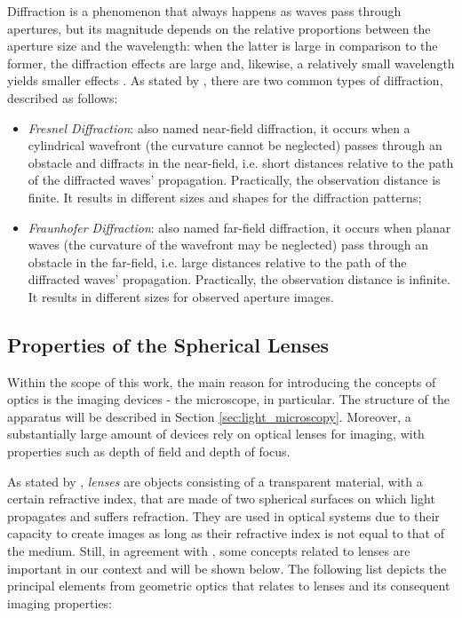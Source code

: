 Diffraction is a phenomenon that always happens as waves pass through apertures, but its magnitude depends on the relative proportions between the aperture size and the wavelength: when the latter is large in comparison to the former, the diffraction effects are large and, likewise, a relatively small wavelength yields smaller effects \cite{tipler2007physics}. As stated by , there are two common types of diffraction, described as follows:

\begin{itemize}
    \item \emph{Fresnel Diffraction}: also named near-field diffraction, it occurs when a cylindrical wavefront (the curvature cannot be neglected) passes through an obstacle and diffracts in the near-field, i.e. short distances relative to the path of the diffracted waves' propagation. Practically, the observation distance is finite. It results in different sizes and shapes for the diffraction patterns;
    
    \item \emph{Fraunhofer Diffraction}: also named far-field diffraction, it occurs when planar waves (the curvature of the wavefront may be neglected) pass through an obstacle in the far-field, i.e. large distances relative to the path of the diffracted waves' propagation. Practically, the observation distance is infinite. It results in different sizes for observed aperture images.
    
\end{itemize}


\subsection{Properties of the Spherical Lenses}

Within the scope of this work, the main reason for introducing the concepts of optics is the imaging devices - the microscope, in particular. The structure of the apparatus will be described in Section \ref{sec:light_microscopy}. Moreover, a substantially large amount of devices rely on optical lenses for imaging, with properties such as depth of field and depth of focus.

As stated by , \emph{lenses} are objects consisting of a transparent material, with a certain refractive index, that are made of two spherical surfaces on which light propagates and suffers refraction. They are used in optical systems due to their capacity to create images as long as their refractive index is not equal to that of the medium. Still, in agreement with , some concepts related to lenses are important in our context and will be shown below. The following list depicts the principal elements from geometric optics that relates to lenses and its consequent imaging properties:

